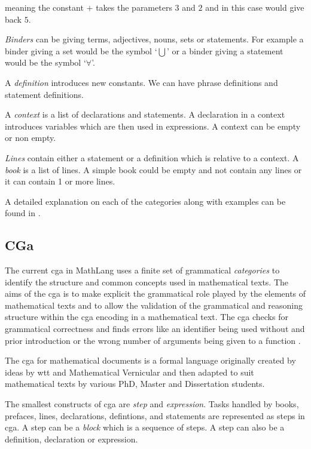 meaning the constant $+$ takes the parameters $3$ and $2$ and in this case would give back $5$.

\emph{Binders} can be giving terms, adjectives, nouns, sets or statements. For example a binder giving a set would be the symbol `$\bigcup$' or a binder giving a statement would be the symbol `$\forall$'.

 A \emph{definition} introduces new constants. We can have phrase definitions and statement definitions.
 
 A \emph{context} is a list of declarations and statements. A declaration in a context introduces variables which are then used in expressions. A context can be empty or non empty.

 \emph{Lines} contain either a statement or a definition which is relative to a context. A \emph{book} is a list of lines. A simple book could be empty and not contain any lines or it can contain 1 or more lines.
 
A detailed explanation on each of the categories along with examples can be found in \cite{wtt}.

\subsection{CGa}
\label{subsec:cga}
The current \gls{cga} in MathLang uses a finite set of grammatical \textit{categories} to identify the 
structure and common concepts used in mathematical texts. The aims of the \gls{cga} is to make explicit 
the grammatical role played by the elements of mathematical texts and to allow the validation of the grammatical and reasoning 
structure within the \gls{cga} encoding in a mathematical text. The \gls{cga} checks for grammatical correctness and finds errors like 
an identifier being used without and prior introduction or the wrong number of arguments being given to a function \cite{krzysztofphd}.

The \gls{cga} for mathematical documents is a formal language originally created by ideas by \gls{wtt} and Mathematical Vernicular \cite{mv} and then adapted to suit mathematical texts by various PhD, Master and Dissertation students.

The smallest constructs of \gls{cga} are \emph{step} and \emph{expression}. Tasks handled by books, prefaces, lines, declarations, defintions, and statements are represented as steps in \gls{cga}. A step can be a \emph{block} which is a sequence of steps. A step can also be a definition, declaration or expression.

